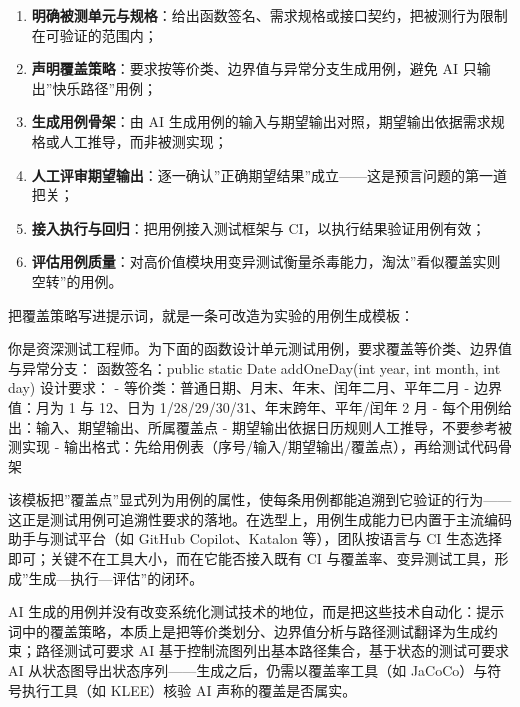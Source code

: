 \documentclass[12pt,a4paper,twoside,openany]{ctexbook}
\numberwithin{figure}{chapter}
\numberwithin{table}{chapter}
\newenvironment{Shaded}{}{}
\newcommand{\NormalTok}[1]{#1}
\providecommand{\tightlist}{\setlength{\itemsep}{0pt}\setlength{\parskip}{0pt}}
\begin{document}
\begin{enumerate}
\def\labelenumi{\arabic{enumi}.}
\tightlist
\item
  \textbf{明确被测单元与规格}：给出函数签名、需求规格或接口契约，把被测行为限制在可验证的范围内；
\item
  \textbf{声明覆盖策略}：要求按等价类、边界值与异常分支生成用例，避免 AI
  只输出''快乐路径''用例；
\item
  \textbf{生成用例骨架}：由 AI
  生成用例的输入与期望输出对照，期望输出依据需求规格或人工推导，而非被测实现；
\item
  \textbf{人工评审期望输出}：逐一确认''正确期望结果''成立------这是预言问题的第一道把关；
\item
  \textbf{接入执行与回归}：把用例接入测试框架与
  CI，以执行结果验证用例有效；
\item
  \textbf{评估用例质量}：对高价值模块用变异测试衡量杀毒能力，淘汰''看似覆盖实则空转''的用例。
\end{enumerate}

把覆盖策略写进提示词，就是一条可改造为实验的用例生成模板：

\begin{Shaded}
\begin{Highlighting}[]
\NormalTok{你是资深测试工程师。为下面的函数设计单元测试用例，要求覆盖等价类、边界值与异常分支：}
\NormalTok{函数签名：public static Date addOneDay(int year, int month, int day)}
\NormalTok{设计要求：}
\NormalTok{{-} 等价类：普通日期、月末、年末、闰年二月、平年二月}
\NormalTok{{-} 边界值：月为 1 与 12、日为 1/28/29/30/31、年末跨年、平年/闰年 2 月}
\NormalTok{{-} 每个用例给出：输入、期望输出、所属覆盖点}
\NormalTok{{-} 期望输出依据日历规则人工推导，不要参考被测实现}
\NormalTok{{-} 输出格式：先给用例表（序号/输入/期望输出/覆盖点），再给测试代码骨架}
\end{Highlighting}
\end{Shaded}

该模板把''覆盖点''显式列为用例的属性，使每条用例都能追溯到它验证的行为------这正是测试用例可追溯性要求的落地。在选型上，用例生成能力已内置于主流编码助手与测试平台（如
GitHub Copilot、Katalon 等），团队按语言与 CI
生态选择即可；关键不在工具大小，而在它能否接入既有 CI
与覆盖率、变异测试工具，形成''生成---执行---评估''的闭环。

AI
生成的用例并没有改变系统化测试技术的地位，而是把这些技术自动化：提示词中的覆盖策略，本质上是把等价类划分、边界值分析与路径测试翻译为生成约束；路径测试可要求
AI 基于控制流图列出基本路径集合，基于状态的测试可要求 AI
从状态图导出状态序列------生成之后，仍需以覆盖率工具（如
JaCoCo）与符号执行工具（如 KLEE）核验 AI 声称的覆盖是否属实。
\end{document}
